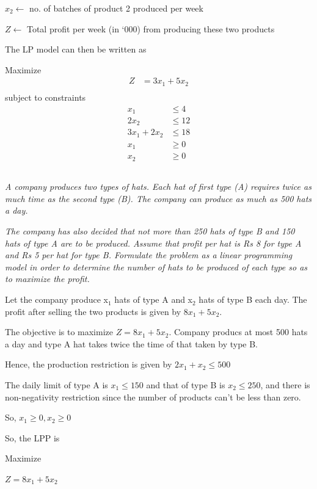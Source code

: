 \documentclass[12pt]{article}
\begin{document}
$x_2 \gets$ no. of batches of product 2 produced per week 

$Z \gets$ Total profit per week (in `000) from producing these two products 

The LP model can then be written as 

Maximize
\begin{align*}
Z            & = 3x_1 + 5x_2 \\
\end{align*}
subject to constraints
\begin{align*}
x_1          & \le 4         \\
2 x_2        & \le 12        \\
3x_1 + 2 x_2 & \le 18        \\
x_1          & \ge 0         \\
x_2          & \ge 0
\end{align*}
\subsection{}

\emph{A company produces two types of hats. Each hat of first type (A)  requires twice as much time as the second type (B). 
The company can produce as much as 500 hats a day. }

\emph{The company has also decided that not more than 250 hats of type B and 150 hats of type A are to be produced. 
Assume that profit per hat is Rs 8 for type A and Rs 5 per hat for type B. Formulate the problem as a linear programming model in order to determine the number of hats to be produced of each type so as to maximize the profit.}

Let the company produce x$_1$ hats of type A and x$_2$ hats of type B each day. The profit after selling the two products is given by 
$8 x_1 + 5 x_2$.

The objective is to maximize $Z = 8 x_1 + 5 x_2$. Company producs at most 500 hats a day and type A hat takes twice the time of that taken by type B.

Hence, the production restriction is given by $2 x_1 +x_2 \le 500$

The daily limit of type A is $x_1\le 150$ and that of type B is $x_2\le 250$, and there is non-negativity restriction since the number of products can't be less than zero. 

So, $x_1\ge 0, x_2\ge 0$

So, the LPP is 

Maximize 
\begin{center}
$Z=8 x_1 + 5 x_2$
\end{center}
\end{document}
